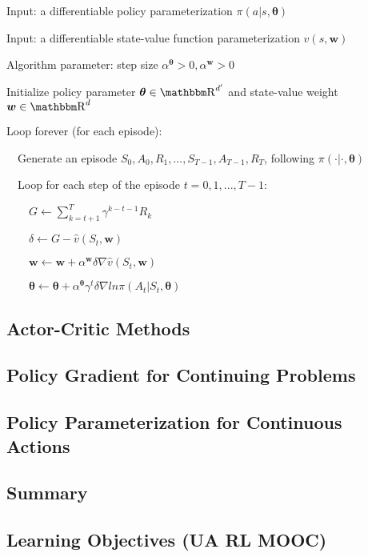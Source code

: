\documentclass[sutton_barto_notes.tex]{subfiles}
\begin{document}
\begin{tcolorbox}[width=1.1\textwidth,title={REINFORCE with baseline (episodic) for estimating $\pi_*$}]
Input: a differentiable policy parameterization $\pi(a|s,\bm{\theta})$

Input: a differentiable state-value function parameterization $\hat{v}(s,\bm{w})$

Algorithm parameter: step size $\alpha^{\bm{\theta}} > 0, \alpha^{\bm{w}} > 0$

Initialize policy parameter $\bm{\theta} \in \R^{d'}$ and state-value weight $\bm{w} \in \R^d$

Loop forever (for each episode):

$\quad$Generate an episode $S_0,A_0,R_1,...,S_{T-1},A_{T-1},R_T$, following $\pi(\cdot|\cdot,\bm{\theta})$

$\quad$Loop for each step of the episode $t=0,1,...,T-1$:

$\quad\quad G\leftarrow\sum_{k=t+1}^T \gamma^{k-t-1}R_k$

$\quad\quad \delta\leftarrow G - \hat{v}(S_t, \bm{w})$

$\quad\quad \bm{w} \leftarrow \bm{w} + \alpha^{\bm{w}}\delta\nabla\hat{v}(S_t,\bm{w})$

$\quad\quad\bm{\theta}\leftarrow\bm{\theta}+\alpha^{\bm{\theta}}\gamma^t \delta \nabla ln\pi(A_t | S_t, \bm{\theta})$
\end{tcolorbox}


\subsection{Actor-Critic Methods}

\subsection{Policy Gradient for Continuing Problems}

\subsection{Policy Parameterization for Continuous Actions}

\subsection{Summary}

\subsection{Learning Objectives (UA RL MOOC)}
\end{document}
